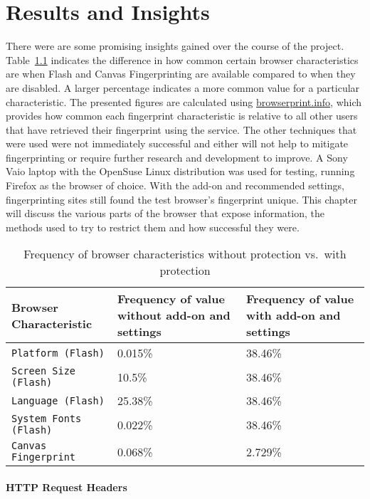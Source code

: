 \chapter{Results and Insights}

There were are some promising insights gained over the course of the project.
Table~\ref{tab:results} indicates the difference in how common certain browser characteristics are when Flash and Canvas Fingerprinting are available compared to when they are disabled.
A larger percentage indicates a more common value for a particular characteristic.
The presented figures are calculated using \url{browserprint.info}, which provides how common each fingerprint characteristic is relative to all other users that have retrieved their fingerprint using the service.
The other techniques that were used were not immediately successful and either will not help to mitigate fingerprinting or require further research and development to improve.
A Sony Vaio laptop with the OpenSuse Linux distribution was used for testing, running Firefox as the browser of choice.
With the add-on and recommended settings, fingerprinting sites still found the test browser's fingerprint unique.
This chapter will discuss the various parts of the browser that expose information, the methods used to try to restrict them and how successful they were.

\begin{table}[h!]
\centering
\begin{tabular}{| p{6cm} | p{4cm} | p{4cm} |}
    \hline
    \textbf{Browser Characteristic} & \textbf{Frequency of value without add-on and settings} & \textbf{Frequency of value with add-on and settings} \\ \hline
    \texttt{Platform (Flash)} & {0.015\%} & {38.46\%} \\ \hline
    \texttt{Screen Size (Flash)} & {10.5\%} & {38.46\%} \\ \hline
    \texttt{Language (Flash)} & {25.38\%} & {38.46\%} \\ \hline
    \texttt{System Fonts (Flash)} & {0.022\%} & {38.46\%} \\ \hline
    \texttt{Canvas Fingerprint} & {0.068\%} & {2.729\%} \\
    \hline
\end{tabular}
\caption{Frequency of browser characteristics without protection vs.\ with protection}
\label{tab:results}
\end{table}

\subsubsection{HTTP Request Headers}

